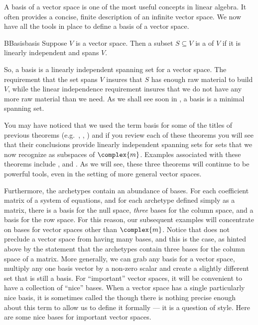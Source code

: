 %
A basis of a vector space is one of the most useful concepts in linear algebra.  It often provides a concise, finite description of an infinite vector space.  
%
%
We now have all the tools in place to define a basis of a vector space.
%
%
\begin{definition}{B}{Basis}{basis}
Suppose $V$ is a vector space.  Then a subset $S\subseteq V$ is a  of $V$ if it is linearly independent and spans $V$.
\end{definition}
%
So, a basis is a linearly independent spanning set for a vector space.  The requirement that the set spans $V$ insures that $S$ has enough raw material to build $V$, while the linear independence requirement insures that we do not have any more raw material than we need.  As we shall see soon in , a basis is a minimal spanning set.\par
%
You may have noticed that we used the term basis for some of the titles of previous theorems (e.g.\ , , ) and if you review each of these theorems you will see that their conclusions provide linearly independent spanning sets for sets that we now recognize as subspaces of $\complex{m}$.  Examples associated with these theorems include ,  and .  As we will see, these three theorems will continue to be powerful tools, even in the setting of more general vector spaces.\par
%
Furthermore, the archetypes contain an abundance of bases.  For each coefficient matrix of a system of equations, and for each archetype defined simply as a matrix, there is a basis for the null space, {\em three} bases for the column space, and a basis for the row space.  For this reason, our subsequent examples will concentrate on bases for vector spaces other than $\complex{m}$.
%
Notice that  does not preclude a vector space from having many bases, and this is the case, as hinted above by the statement that the archetypes contain three bases for the column space of a matrix.  More generally, we can grab any basis for a vector space, multiply any one basis vector by a non-zero scalar and create a slightly different set that is still a basis.  For ``important'' vector spaces, it will be convenient to have a collection of ``nice'' bases.  When a vector space has a single particularly nice basis, it is sometimes called the  though there is nothing precise enough about this term to allow us to define it formally --- it is a question of style.  Here are some nice bases for important vector spaces.
